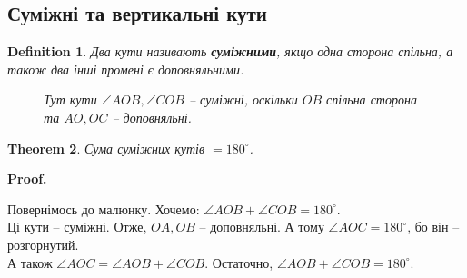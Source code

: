 \documentclass[a4paper, 10pt]{article}
\makeatletter
\theoremstyle{theoremdd}
\newtheorem{theorem}{Theorem}[subsection]
\theoremstyle{theoremdd}
\theoremstyle{theoremdd}
\newtheorem{definition}[theorem]{Definition}
\theoremstyle{theoremdd}
\theoremstyle{theoremdd}
\theoremstyle{theoremdd}
\theoremstyle{theoremdd}
\theoremstyle{theoremdd}
\theoremstyle{theoremdd}
\renewenvironment{proof}[1][Proof.\\]{\par
\pushQED{\hfill \qed}%
\normalfont \topsep6\p@\@plus6\p@\relax
\trivlist
\item\relax
{\bfseries
#1\@addpunct{.}}\hspace\labelsep\ignorespaces
}{%
\popQED\endtrivlist\@endpefalse
}
\makeatother
\begin{document}

\subsection{Суміжні та вертикальні кути}
\begin{definition}
Два кути називають \textbf{суміжними}, якщо одна сторона спільна, а також два інші промені є доповняльними.
\begin{figure}[H]
\centering
{}
\caption*{Тут кути $\angle AOB, \angle COB$ -- суміжні, оскільки $OB$ спільна сторона та $AO,OC$ -- доповняльні.}
\end{figure}
\end{definition}

\begin{theorem}
Сума суміжних кутів $= 180^{\circ}$.
\end{theorem}

\begin{proof}
Повернімось до малюнку. Хочемо: $\angle AOB + \angle COB = 180^{\circ}$.\\
Ці кути -- суміжні. Отже, $OA,OB$ -- доповняльні. А тому $\angle AOC = 180^{\circ}$, бо він -- розгорнутий.\\
А також $\angle AOC = \angle AOB + \angle COB$. Остаточно, $\angle AOB + \angle COB = 180^{\circ}$.
\end{proof}
\end{document}
